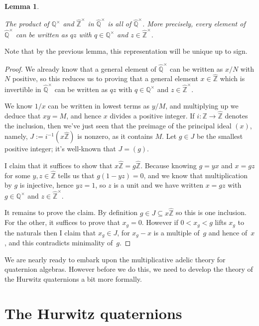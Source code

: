 \documentclass[10pt,a4paper]{article}
\newcommand{\Z}{\mathbb{Z}}
\newcommand{\Q}{\mathbb{Q}}
\newcommand{\Qhat}{\widehat{\Q}}
\newcommand{\Zhat}{\widehat{\Z}}
\newtheorem{lemma}[theorem]{Lemma}
\newcommand{\uses}[1]{}
\newcommand{\lean}[1]{}
\newcommand{\leanok}{}
\begin{document}
\begin{lemma}
    \label{QHat.unitsrat_join_unitszHat}
    \lean{QHat.unitsrat_join_unitszHat}
    \uses{QHat,ZHat.commRing}
    \leanok
    The product of $\Q^\times$ and $\Zhat^\times$ in $\Qhat^\times$ is all of $\Qhat^\times$.
    More precisely, every element of $\Qhat^\times$ can be written as $qz$ with $q\in\Q^\times$
    and $z\in\Zhat^\times$.
\end{lemma}
Note that by the previous lemma, this representation will be unique up to sign.
\begin{proof}
    \uses{ZHat.multiples,ZHat.eq_zero_of_mul_eq_zero,QHat.canonicalForm}
    \leanok
  We already know that a general element of $\Qhat^\times$ can be written as $x/N$ with $N$
  positive, so this reduces us to proving that a general element $x\in\Zhat$ which is invertible
  in $\Qhat^\times$ can be written as $qz$ with $q\in\Q^\times$ and $z\in\Zhat^\times$.

  We know $1/x$ can be written in lowest terms as $y/M$, and multiplying up we deduce
  that $xy=M$, and hence $x$ divides a positive integer. If $i:\Z\to\Zhat$ denotes
  the inclusion, then we've just seen that the preimage of the principal
  ideal $(x)$, namely, $J:=i^{-1}(x\Zhat)$ is nonzero, as it contains $M$.
  Let $g\in J$ be the smallest positive integer; it's well-known that $J=(g)$.

  I claim that it suffices to show that $x\Zhat=g\Zhat$. Because knowing $g=yx$ and
  $x=gz$ for some $y,z\in\Zhat$ tells us that $g(1-yz)=0$, and we know that multiplication by $g$ is injective,
  hence $yz=1$, so $z$ is a unit and we have written $x=gz$ with $g\in\Q^\times$ and $z\in\Zhat^\times$.

  It remains to prove the claim. By definition $g\in J\subseteq x\Zhat$ so this is one
  inclusion. For the other, it suffices to prove that $x_g=0$. However if $0<x_g<g$
  lifts $x_g$ to the naturals then I claim that $x_g\in J$, for $x_g-x$ is a multiple
  of~$g$ and hence of~$x$, and this contradicts minimality of~$g$.
\end{proof}

We are nearly ready to embark upon the multiplicative adelic theory for quaternion algebras.
However before we do this, we need to develop the theory of the Hurwitz quaternions a bit
more formally.

\section{The Hurwitz quaternions}
\end{document}
